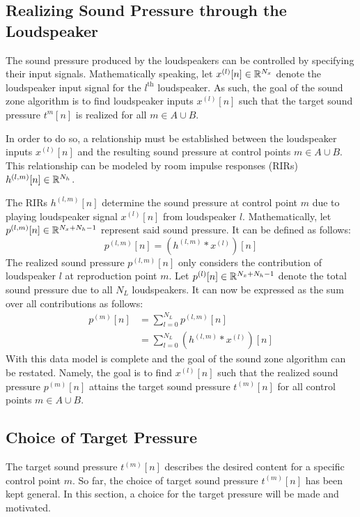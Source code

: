 \subsection{Realizing Sound Pressure through the Loudspeaker}
\label{ch:sound_zone:data_model:sound_pressure}
The sound pressure produced by the loudspeakers can be controlled by specifying their input signals.
Mathematically speaking, let $x^{(l)}[n]\in\mathbb{R}^{N_x}$ denote the loudspeaker input signal for the $l^\text{th}$ loudspeaker.
As such, the goal of the sound zone algorithm is to find loudspeaker inputs $x^{(l)}[n]$ 
such that the target sound pressure $t^{m}[n]$ is realized for all $m\in A \cup B$.

In order to do so, a relationship must be established between the loudspeaker inputs $x^{(l)}[n]$
and the resulting sound pressure at control points $m\in A \cup B$. 
This relationship can be modeled by room impulse responses (RIRs) $h^{(l,m)}[n]\in\mathbb{R}^{N_h}$.

The RIRs $h^{(l,m)}[n]$ determine the sound pressure at control point $m$ due to playing loudspeaker signal $x^{(l)}[n]$ from loudspeaker $l$. 
Mathematically, let $p^{(l,m)}[n]\in\mathbb{R}^{N_x + N_h - 1}$ represent said sound pressure. 
It can be defined as follows:
\begin{equation}
    p^{(l,m)}[n] = \left(h^{(l,m)} \ast x^{(l)}\right)[n]
\end{equation}
The realized sound pressure $p^{(l,m)}[n]$ only considers the contribution of loudspeaker $l$ at reproduction point $m$.
Let $p^{(l)}[n]\in\mathbb{R}^{N_x + N_h - 1}$ denote the total sound pressure due to all $N_L$ loudspeakers.
It can now be expressed as the sum over all contributions as follows: 
\begin{align}
    p^{(m)}[n] &= \sum_{l=0}^{N_L} p^{(l,m)}[n] \\
               &= \sum_{l=0}^{N_L} \left(h^{(l,m)} \ast x^{(l)}\right)[n]
\end{align}
With this data model is complete and the goal of the sound zone algorithm can be restated.
Namely, the goal is to find $x^{(l)}[n]$ such that the realized sound pressure $p^{(m)}[n]$ attains the
target sound pressure $t^{(m)}[n]$ for all control points $m\in A \cup B$.

\subsection{Choice of Target Pressure}
\label{ch:sound_zone:data_model:target_pressure}
The target sound pressure $t^{(m)}[n]$ describes the desired content for a specific control point $m$. 
So far, the choice of target sound pressure $t^{(m)}[n]$ has been kept general. 
In this section, a choice for the target pressure will be made and motivated.


